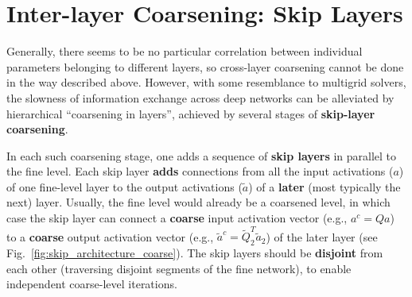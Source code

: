 \documentclass{article} %
\begin{document}
\section{Inter-layer Coarsening: Skip Layers}
\label{sec:skip_layers}

Generally, there seems to be no particular correlation between individual parameters belonging to different layers, so cross-layer coarsening cannot be done in the way described above. However, with some resemblance to multigrid solvers, the slowness of information exchange across deep networks can be alleviated by hierarchical ``coarsening in layers'', achieved by several stages of \textbf{skip-layer coarsening}.

In each such coarsening stage, one adds a sequence of \textbf{skip layers} in parallel to the fine level. Each skip layer \textbf{adds} connections from all the input activations ($a$) of one fine-level layer to the output activations ($\tilde{a}$) of a \textbf{later} (most typically the next) layer. Usually, the fine level would already be a coarsened level, in which case the skip layer can connect a \textbf{coarse} input activation vector (e.g., $a^c = Qa$) to a \textbf{coarse} output activation vector (e.g., $\tilde{a}^c = \tilde{Q}_2^T \tilde{a}_2$) of the later layer (see Fig.~\ref{fig:skip_architecture_coarse}). The skip layers should be \textbf{disjoint} from each other (traversing disjoint segments of the fine network), to enable independent coarse-level iterations.
\end{document}
